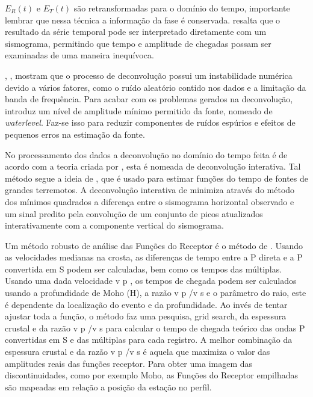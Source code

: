 $E_{R}(t)$ e $E_{T}(t)$ são retransformadas para o domínio do tempo, importante lembrar que nessa técnica a informação da fase é conservada. \cite{langston_structure_1979} resalta que o resultado da série temporal pode ser interpretado diretamente com um sismograma, permitindo que tempo e amplitude de chegadas possam ser examinadas de uma maneira inequívoca.

\cite{clayton_source_1976}, \cite{langston_structure_1979}, \cite{ligorria_iterative_1999} mostram que o processo de deconvolução possui um instabilidade numérica devido a vários fatores, como o ruído aleatório contido nos dados e a limitação da banda de frequência. Para acabar com os problemas gerados na deconvolução, \cite{clayton_source_1976} introduz um nível de amplitude mínimo permitido da fonte, nomeado de \textit{waterlevel}. Faz-se isso para reduzir componentes de ruídos espúrios e efeitos de pequenos erros na estimação da fonte.

No processamento dos dados a deconvolução no domínio do tempo feita é de acordo com a teoria criada por \cite{ligorria_iterative_1999}, esta é nomeada de deconvolução interativa. Tal método segue a ideia de \cite{kikuchi_inversion_1982}, que é usado para estimar funções do tempo de fontes de grandes terremotos. A deconvolução interativa de  \cite{ligorria_iterative_1999} minimiza através do método dos mínimos quadrados a diferença entre o sismograma horizontal observado e um sinal predito pela convolução de um conjunto de picos atualizados interativamente com a componente vertical do sismograma. 
 
Um método robusto de análise das Funções do Receptor é o método de \cite{Zhu_Kanamori_2000}. Usando as velocidades medianas na crosta, as diferenças de tempo entre a P direta e a P convertida em S podem ser calculadas, bem como os tempos das múltiplas. Usando uma dada velocidade v p , os tempos de chegada podem ser calculados usando a profundidade de Moho (H), a razão v p /v s e o parâmetro do raio, este é dependente da localização do evento e da profundidade. Ao invés de tentar ajustar toda a função, o método faz uma pesquisa, grid search, da espessura crustal e da razão v p /v s para calcular o tempo de chegada teórico das ondas P convertidas em S e das múltiplas para cada registro. A melhor combinação da espessura crustal e da razão v p /v s é aquela que maximiza o valor das amplitudes reais das funções receptor. Para obter uma imagem das discontinuidades, como por exemplo Moho, as Funções do Receptor empilhadas são mapeadas em relação a posição da estação no perfil. 

